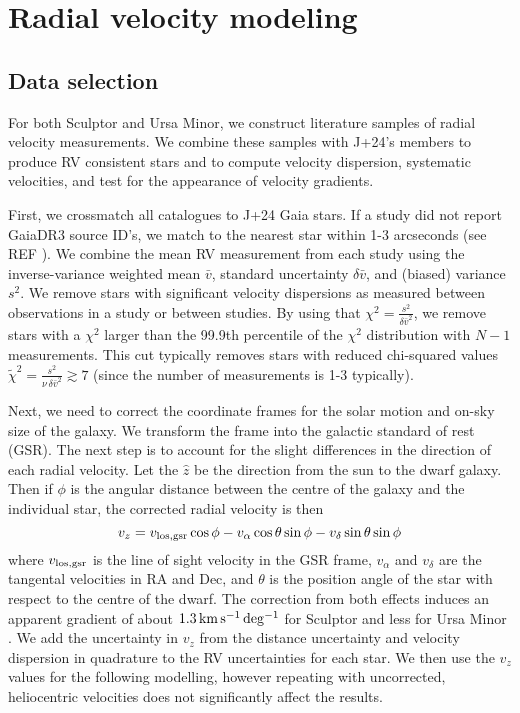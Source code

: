 \section{Radial velocity modeling}\label{sec:rv_obs}

\subsection{Data selection}\label{data-selection}

For both Sculptor and Ursa Minor, we construct literature samples of
radial velocity measurements. We combine these samples with J+24's
members to produce RV consistent stars and to compute velocity
dispersion, systematic velocities, and test for the appearance of
velocity gradients.

First, we crossmatch all catalogues to J+24 Gaia stars. If a study did
not report GaiaDR3 source ID's, we match to the nearest star within 1-3
arcseconds (see REF \citet{tab:rv_measurements}). We combine the mean RV
measurement from each study using the inverse-variance weighted mean
\(\bar v\), standard uncertainty \(\delta \bar v\), and (biased)
variance \(s^2\). We remove stars with significant velocity dispersions
as measured between observations in a study or between studies. By using
that \(\chi^2=\frac{s^2}{\delta \bar v^2}\), we remove stars with a
\(\chi^2\) larger than the 99.9th percentile of the \(\chi^2\)
distribution with \(N-1\) measurements. This cut typically removes stars
with reduced chi-squared values
\(\tilde\chi^2  = \frac{s^2}{\nu\,\delta \bar v^2}\gtrsim 7\) (since the
number of measurements is 1-3 typically).

Next, we need to correct the coordinate frames for the solar motion and
on-sky size of the galaxy. We transform the frame into the galactic
standard of rest (GSR). The next step is to account for the slight
differences in the direction of each radial velocity. Let the \(\hat z\)
be the direction from the sun to the dwarf galaxy. Then if \(\phi\) is
the angular distance between the centre of the galaxy and the individual
star, the corrected radial velocity is then \begin{equation}
v_z = v_{\rm los, gsr}\cos\phi  - v_{\alpha}\cos\theta \sin\phi - v_\delta \sin\theta\sin\phi
\end{equation} where \(v_{\rm los, gsr}\) is the line of sight velocity
in the GSR frame, \(v_\alpha\) and \(v_\delta\) are the tangental
velocities in RA and Dec, and \(\theta\) is the position angle of the
star with respect to the centre of the dwarf. The correction from both
effects induces an apparent gradient of about \(1.3\,{\rm km\,s^{-1}\,deg^{-1}}\) for
Sculptor and less for Ursa Minor \citep[see
also][]{WMO2008, strigari2010}. We add the uncertainty in \(v_z\) from
the distance uncertainty and velocity dispersion in quadrature to the RV
uncertainties for each star. We then use the \(v_z\) values for the
following modelling, however repeating with uncorrected, heliocentric
velocities does not significantly affect the results.

